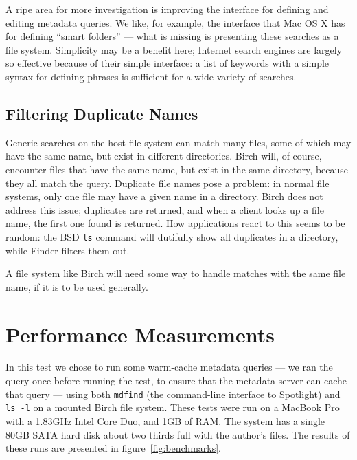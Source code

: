 \documentclass{article}
\begin{document}
A ripe area for more investigation is improving the interface for
defining and editing metadata queries. We like, for example, the
interface that Mac OS X has for defining ``smart folders'' ---
what is missing is presenting these searches as a file system.
Simplicity may be a benefit here; Internet search engines are largely
so effective because of their simple interface: a list of keywords
with a simple syntax for defining phrases is sufficient for a wide
variety of searches.

\subsection{Filtering Duplicate Names}

Generic searches on the host file system can match many files, some of
which may have the same name, but exist in different directories.
Birch will, of course, encounter files that have the same name, but
exist in the same directory, because they all match the query.
Duplicate file names pose a problem: in normal file systems, only one
file may have a given name in a directory. Birch does not address this
issue; duplicates are returned, and when a client looks up a file
name, the first one found is returned. How applications react to this
seems to be random: the BSD \texttt{ls} command will dutifully show
all duplicates in a directory, while Finder filters them out.

A file system like Birch will need some way to handle matches with the
same file name, if it is to be used generally.

\section{Performance Measurements}

In this test we chose to run some warm-cache metadata queries --- we
ran the query once before running the test, to ensure that the
metadata server can cache that query --- using both \texttt{mdfind}
(the command-line interface to Spotlight) and \texttt{ls -l} on a
mounted Birch file system. These tests were run on a MacBook Pro with
a 1.83GHz Intel Core Duo, and 1GB of RAM. The system has a single 80GB
SATA hard disk about two thirds full with the author's files. The
results of these runs are presented in figure~\ref{fig:benchmarks}.
\end{document}
